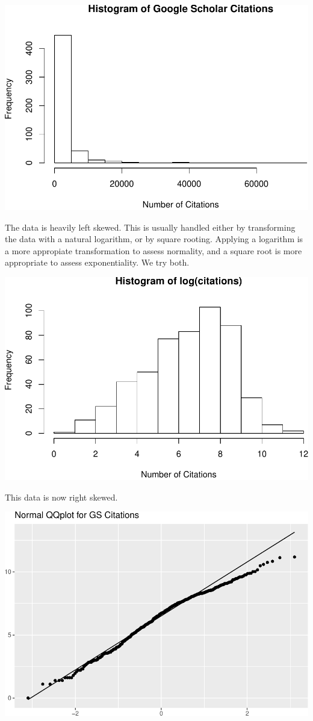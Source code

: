 \documentclass[]{article}
\begin{document}
\includegraphics{final_files/figure-latex/unnamed-chunk-4-1.pdf}

The data is heavily left skewed. This is usually handled either by
transforming the data with a natural logarithm, or by square rooting.
Applying a logarithm is a more appropiate transformation to assess
normality, and a square root is more appropriate to assess
exponentiality. We try both.

\includegraphics{final_files/figure-latex/unnamed-chunk-5-1.pdf}

This data is now right skewed.

\includegraphics{final_files/figure-latex/unnamed-chunk-6-1.pdf}
\end{document}
